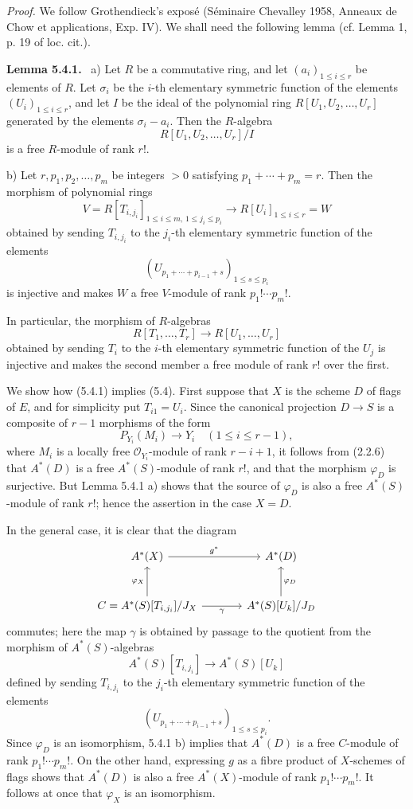 \documentclass[11pt]{article}
\newenvironment{statement}[1]{\par\medskip\noindent\textbf{#1.}\ }{\par\medskip}
\begin{document}
\emph{Proof.} We follow Grothendieck's exposé (Séminaire Chevalley 1958, Anneaux de Chow et applications, Exp. IV). We shall need the following lemma (cf. Lemma 1, p. 19 of loc. cit.).

\begin{statement}{Lemma 5.4.1}
a) Let $R$ be a commutative ring, and let $(a_i)_{1\le i\le r}$ be elements of $R$. Let $\sigma_i$ be the $i$-th elementary symmetric function of the elements $(U_i)_{1\le i\le r}$, and let $I$ be the ideal of the polynomial ring $R[U_1,U_2,\ldots,U_r]$ generated by the elements $\sigma_i-a_i$. Then the $R$-algebra
\[
R[U_1,U_2,\ldots,U_r]/I
\]
is a free $R$-module of rank $r!$.

b) Let $r,p_1,p_2,\ldots,p_m$ be integers $>0$ satisfying $p_1+\cdots+p_m=r$. Then the morphism of polynomial rings
\[
V=R[T_{i,j_i}]_{1\le i\le m,\,1\le j_i\le p_i}
\longrightarrow R[U_i]_{1\le i\le r}=W
\]
obtained by sending $T_{i,j_i}$ to the $j_i$-th elementary symmetric function of the elements
\[
(U_{p_1+\cdots+p_{i-1}+s})_{1\le s\le p_i}
\]
is injective and makes $W$ a free $V$-module of rank $p_1!\cdots p_m!$.

In particular, the morphism of $R$-algebras
\[
R[T_1,\ldots,T_r]\to R[U_1,\ldots,U_r]
\]
obtained by sending $T_i$ to the $i$-th elementary symmetric function of the $U_j$ is injective and makes the second member a free module of rank $r!$ over the first.
\end{statement}

We show how (5.4.1) implies (5.4). First suppose that $X$ is the scheme $D$ of flags of $E$, and for simplicity put $T_{i1}=U_i$. Since the canonical projection $D\to S$ is a composite of $r-1$ morphisms of the form
\[
P_{Y_i}(M_i)\to Y_i\quad(1\le i\le r-1),
\]
where $M_i$ is a locally free $\mathcal O_{Y_i}$-module of rank $r-i+1$, it follows from (2.2.6) that $A^*(D)$ is a free $A^*(S)$-module of rank $r!$, and that the morphism $\varphi_D$ is surjective. But Lemma 5.4.1 a) shows that the source of $\varphi_D$ is also a free $A^*(S)$-module of rank $r!$; hence the assertion in the case $X=D$.

In the general case, it is clear that the diagram
\[
\begin{tikzcd}[column sep=large,row sep=large]
A^*(X) \arrow[r,"g^*"] & A^*(D)\\
C=A^*(S)[T_{i,j_i}]/J_X \arrow[u,"\varphi_X"] \arrow[r,"\gamma"'] &
A^*(S)[U_k]/J_D \arrow[u,"\varphi_D"']
\end{tikzcd}
\]
commutes; here the map $\gamma$ is obtained by passage to the quotient from the morphism of $A^*(S)$-algebras
\[
A^*(S)[T_{i,j_i}]\to A^*(S)[U_k]
\]
defined by sending $T_{i,j_i}$ to the $j_i$-th elementary symmetric function of the elements
\[
(U_{p_1+\cdots+p_{i-1}+s})_{1\le s\le p_i}.
\]
Since $\varphi_D$ is an isomorphism, 5.4.1 b) implies that $A^*(D)$ is a free $C$-module of rank $p_1!\cdots p_m!$. On the other hand, expressing $g$ as a fibre product of $X$-schemes of flags shows that $A^*(D)$ is also a free $A^*(X)$-module of rank $p_1!\cdots p_m!$. It follows at once that $\varphi_X$ is an isomorphism.
\end{document}
